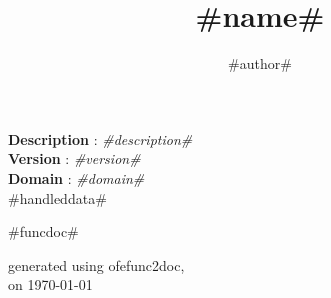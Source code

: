 \documentclass[a4paper,10pt]{article}
\title{#name# \linebreak \textcolor{blue}{\sf{#title#}}}
\author{#author#}
\date{}
\begin{document}
\maketitle

\noindent \textbf{Description} : \textit{#description#}\\
\noindent \textbf{Version} : \textit{#version#}\\
\noindent \textbf{Domain} : \textit{#domain#}\\

#handleddata#

\bigskip
\bigskip

\begin{multicols}{2}

#funcdoc#

\end{multicols}

\bigskip
\bigskip
\small
\begin{flushright}generated using ofefunc2doc,\\
on \today\end{flushright}
\small
\end{document}
